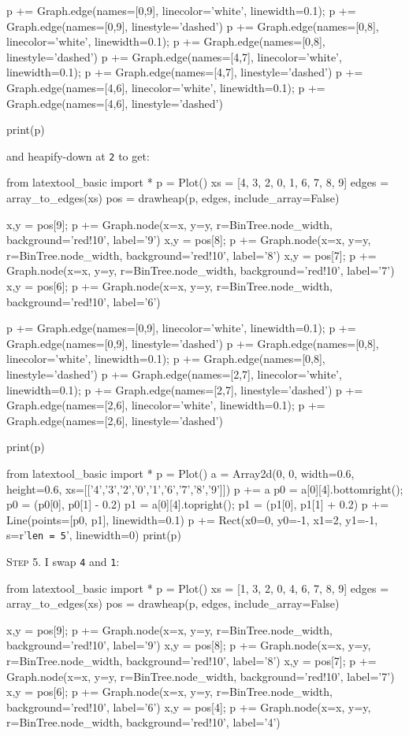 p += Graph.edge(names=[0,9], linecolor='white', linewidth=0.1); p += Graph.edge(names=[0,9], linestyle='dashed')
p += Graph.edge(names=[0,8], linecolor='white', linewidth=0.1); p += Graph.edge(names=[0,8], linestyle='dashed')
p += Graph.edge(names=[4,7], linecolor='white', linewidth=0.1); p += Graph.edge(names=[4,7], linestyle='dashed')
p += Graph.edge(names=[4,6], linecolor='white', linewidth=0.1); p += Graph.edge(names=[4,6], linestyle='dashed')

print(p)

and heapify-down at \texttt{2} to get:


from latextool_basic import *
p = Plot()
xs = [4, 3, 2, 0, 1, 6, 7, 8, 9]
edges = array_to_edges(xs)
pos = drawheap(p, edges, include_array=False)

x,y = pos[9]; p += Graph.node(x=x, y=y, r=BinTree.node_width, background='red!10', label='9')
x,y = pos[8]; p += Graph.node(x=x, y=y, r=BinTree.node_width, background='red!10', label='8')
x,y = pos[7]; p += Graph.node(x=x, y=y, r=BinTree.node_width, background='red!10', label='7')
x,y = pos[6]; p += Graph.node(x=x, y=y, r=BinTree.node_width, background='red!10', label='6')

p += Graph.edge(names=[0,9], linecolor='white', linewidth=0.1); p += Graph.edge(names=[0,9], linestyle='dashed')
p += Graph.edge(names=[0,8], linecolor='white', linewidth=0.1); p += Graph.edge(names=[0,8], linestyle='dashed')
p += Graph.edge(names=[2,7], linecolor='white', linewidth=0.1); p += Graph.edge(names=[2,7], linestyle='dashed')
p += Graph.edge(names=[2,6], linecolor='white', linewidth=0.1); p += Graph.edge(names=[2,6], linestyle='dashed')

print(p)

from latextool_basic import *
p = Plot()
a = Array2d(0, 0, width=0.6, height=0.6, 
             xs=[['4','3','2','0','1','6','7','8','9']])
p += a
p0 = a[0][4].bottomright(); p0 = (p0[0], p0[1] - 0.2)
p1 = a[0][4].topright(); p1 = (p1[0], p1[1] + 0.2)
p += Line(points=[p0, p1], linewidth=0.1)
p += Rect(x0=0, y0=-1, x1=2, y1=-1, s=r'\texttt{len = 5}', linewidth=0) 
print(p)


\textsc{Step 5}.
I swap \texttt{4} and \texttt{1}:


from latextool_basic import *
p = Plot()
xs = [1, 3, 2, 0, 4, 6, 7, 8, 9]
edges = array_to_edges(xs)
pos = drawheap(p, edges, include_array=False)

x,y = pos[9]; p += Graph.node(x=x, y=y, r=BinTree.node_width, background='red!10', label='9')
x,y = pos[8]; p += Graph.node(x=x, y=y, r=BinTree.node_width, background='red!10', label='8')
x,y = pos[7]; p += Graph.node(x=x, y=y, r=BinTree.node_width, background='red!10', label='7')
x,y = pos[6]; p += Graph.node(x=x, y=y, r=BinTree.node_width, background='red!10', label='6')
x,y = pos[4]; p += Graph.node(x=x, y=y, r=BinTree.node_width, background='red!10', label='4')

